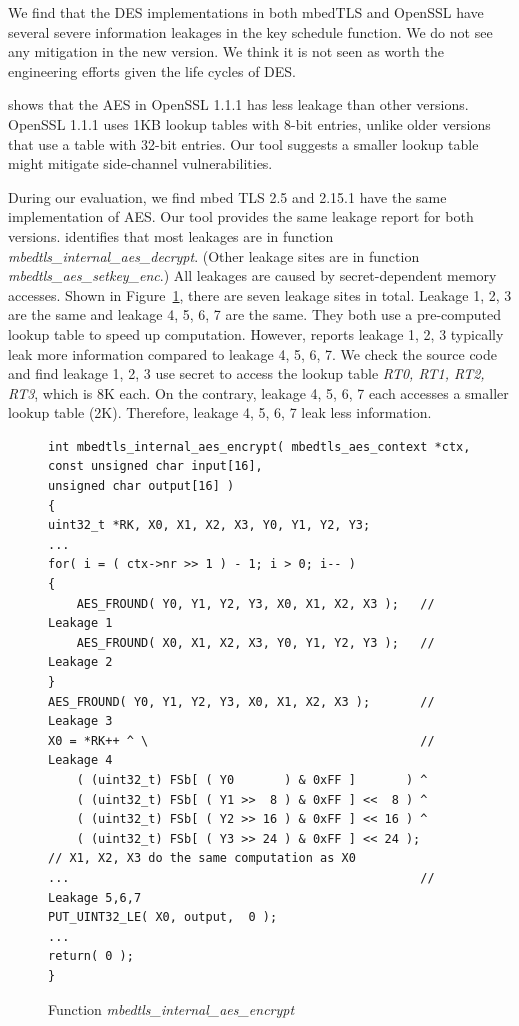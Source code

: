We find that the DES implementations in both mbedTLS and OpenSSL have several severe information leakages in the key schedule function. We do not see any mitigation
in the new version. We think it is not seen as worth the engineering efforts given the life cycles of DES\@.

\tool{} shows that the AES in OpenSSL 1.1.1 has less leakage than other versions.
OpenSSL 1.1.1 uses 1KB lookup tables with 8-bit entries, unlike older versions that use a table with 32-bit entries. Our tool suggests a smaller lookup table might mitigate side-channel vulnerabilities.

During our evaluation, we find mbed TLS 2.5 and 2.15.1 have the same
implementation of AES\@. Our tool provides the same leakage report for both
versions. \tool{} identifies that most leakages are in function
\emph{mbedtls\_internal\_aes\_decrypt}. (Other leakage sites are in function
\emph{mbedtls\_aes\_setkey\_enc}.) All leakages are caused by secret-dependent
memory accesses. Shown in Figure~\ref{mbedtls_aes}, there are seven leakage
sites in total. Leakage 1, 2, 3 are the same and leakage 4, 5, 6, 7 are the
same. They both use a pre-computed lookup table to speed up computation.
However, \tool{} reports leakage 1, 2, 3 typically leak more information
compared to leakage 4, 5, 6, 7. We check the source code and find leakage 1, 2,
3 use secret to access the lookup table \emph{RT0, RT1, RT2, RT3}, which is 8K
each. On the contrary, leakage 4, 5, 6, 7 each accesses a smaller lookup table
(2K). Therefore, leakage 4, 5, 6, 7 leak less information.

\begin{figure}%
    \centering
    \begin{lstlisting}[xleftmargin=.2\textwidth, xrightmargin=.0\textwidth, frame=none]
int mbedtls_internal_aes_encrypt( mbedtls_aes_context *ctx,
const unsigned char input[16],
unsigned char output[16] )
{
uint32_t *RK, X0, X1, X2, X3, Y0, Y1, Y2, Y3;
...
for( i = ( ctx->nr >> 1 ) - 1; i > 0; i-- )
{
    AES_FROUND( Y0, Y1, Y2, Y3, X0, X1, X2, X3 );   // Leakage 1
    AES_FROUND( X0, X1, X2, X3, Y0, Y1, Y2, Y3 );   // Leakage 2
}
AES_FROUND( Y0, Y1, Y2, Y3, X0, X1, X2, X3 );       // Leakage 3
X0 = *RK++ ^ \                                      // Leakage 4
    ( (uint32_t) FSb[ ( Y0       ) & 0xFF ]       ) ^
    ( (uint32_t) FSb[ ( Y1 >>  8 ) & 0xFF ] <<  8 ) ^
    ( (uint32_t) FSb[ ( Y2 >> 16 ) & 0xFF ] << 16 ) ^
    ( (uint32_t) FSb[ ( Y3 >> 24 ) & 0xFF ] << 24 );
// X1, X2, X3 do the same computation as X0
...                                                 // Leakage 5,6,7
PUT_UINT32_LE( X0, output,  0 );
...
return( 0 );
}
\end{lstlisting}
    \caption{Function \textit{mbedtls\_internal\_aes\_encrypt}}
    \label{mbedtls_aes}
\end{figure}

